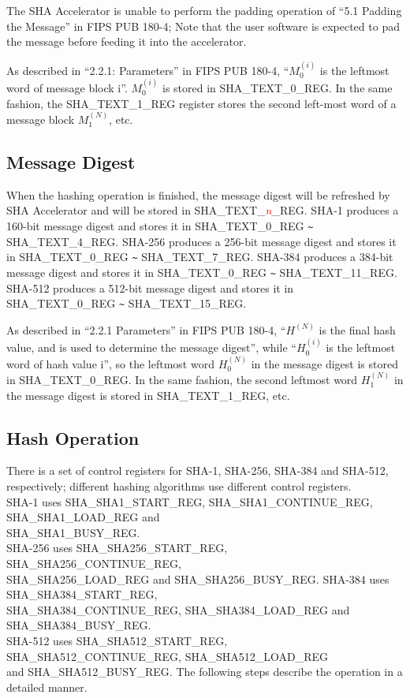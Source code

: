 \documentclass[main\_\_EN.tex]{subfiles}
\begin{document}
The SHA Accelerator is unable to perform the padding operation of “5.1 Padding the Message” in FIPS PUB 180-4; Note that the user software is expected to pad the message before feeding it into the accelerator.


As described in “2.2.1: Parameters” in FIPS PUB 180-4, “$M_{0}^{(i)}$ is the leftmost word of message block i”. $M_{0}^{(i)}$ is stored in SHA\_TEXT\_0\_REG. In the same fashion, the SHA\_TEXT\_1\_REG register stores the second left-most word of a message block $M_{1}^{(N)}$, etc.

\subsection{Message Digest}

When the hashing operation is finished, the message digest will be refreshed by SHA Accelerator and will be stored in SHA\_TEXT\_\textcolor{red}{\it{n}}\_REG. SHA-1 produces a 160-bit message digest and stores it in SHA\_TEXT\_0\_REG \verb+~+ SHA\_TEXT\_4\_REG. SHA-256 produces a 256-bit message digest and stores it in SHA\_TEXT\_0\_REG \verb+~+ SHA\_TEXT\_7\_REG. SHA-384 produces a 384-bit message digest and stores it in SHA\_TEXT\_0\_REG \verb+~+ SHA\_TEXT\_11\_REG. SHA-512 produces a 512-bit message digest and stores it in SHA\_TEXT\_0\_REG \verb+~+ SHA\_TEXT\_15\_REG.

As described in “2.2.1 Parameters” in FIPS PUB 180-4, “$H^{(N)}$ is the final hash value, and is used to determine the message digest”, while “$H_{0}^{(i)}$ is the leftmost word of hash value i”, so the leftmost word $H_{0}^{(N)}$ in the message digest is stored in SHA\_TEXT\_0\_REG. In the same fashion, the second leftmost word $H_{1}^{(N)}$ in the message digest is stored in SHA\_TEXT\_1\_REG, etc.



\subsection{Hash Operation}

There is a set of control registers for SHA-1, SHA-256, SHA-384 and SHA-512, respectively; different hashing algorithms use different control registers.\\
SHA-1 uses SHA\_SHA1\_START\_REG, SHA\_SHA1\_CONTINUE\_REG, SHA\_SHA1\_LOAD\_REG and\\
SHA\_SHA1\_BUSY\_REG.\\ SHA-256 uses SHA\_SHA256\_START\_REG, SHA\_SHA256\_CONTINUE\_REG, \\
SHA\_SHA256\_LOAD\_REG and SHA\_SHA256\_BUSY\_REG. SHA-384 uses SHA\_SHA384\_START\_REG,\\
SHA\_SHA384\_CONTINUE\_REG, SHA\_SHA384\_LOAD\_REG and SHA\_SHA384\_BUSY\_REG.\\
SHA-512 uses SHA\_SHA512\_START\_REG, SHA\_SHA512\_CONTINUE\_REG, SHA\_SHA512\_LOAD\_REG\\ and SHA\_SHA512\_BUSY\_REG. The following steps describe the operation in a detailed manner.
\end{document}
